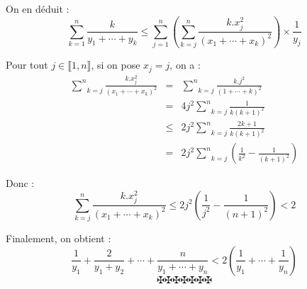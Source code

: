 On en d{\'e}duit :
\[ \underset{k = 1}{\overset{n}{\sum}} \frac{k}{y_1 + \cdots + y_k} \leqslant
   \underset{j = 1}{\overset{n}{\sum}} \left( \underset{k =
   j}{\overset{n}{\sum}} \frac{k.x^2_j}{(x_1 + \cdots + x_k)^2} \right) \times
   \frac{1}{y_j} \]


Pour tout $j \in \llbracket 1, n \rrbracket$, si on pose $x_j = j$, on a :
\begin{eqnarray*}
  \underset{k = j}{\overset{n}{\sum}} \frac{k.x^2_j}{(x_1 + \cdots + x_k)^2} &
  = & \underset{k = j}{\overset{n}{\sum}} \frac{k.j^2}{(1 + \cdots + k)^2}\\
  & = & 4 j^2 \underset{k = j}{\overset{n}{\sum}} \frac{1}{k (k + 1)^2}\\
  & \leqslant & 2 j^2 \underset{k = j}{\overset{n}{\sum}} \frac{2 k + 1}{k (k
  + 1)^2}\\
  & = & 2 j^2 \underset{k = j}{\overset{n}{\sum}} \left( \frac{1}{k^2} -
  \frac{1}{(k + 1)^2} \right)
\end{eqnarray*}


Donc :
\[ \underset{k = j}{\overset{n}{\sum}} \frac{k.x^2_j}{(x_1 + \cdots + x_k)^2}
   \leqslant 2 j^2 \left( \frac{1}{j^2} - \frac{1}{(n + 1)^2} \right) < 2 \]


Finalement, on obtient :
\[ \frac{1}{y_1} + \frac{2}{y_1 + y_2} + \cdots + \frac{n}{y_1 + \cdots + y_n}
   < 2 \left( \frac{1}{y_1} + \cdots + \frac{1}{y_n} \right) \]
\[ \maltese \maltese \maltese \maltese \maltese \maltese \maltese \]
